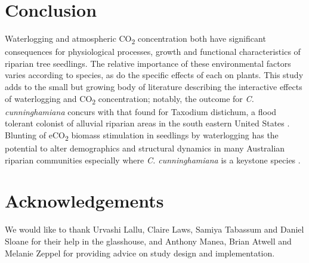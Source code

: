 \documentclass[12pt,a4paper]{memoir}
\begin{document}
\section{Conclusion}
Waterlogging and atmospheric CO\textsubscript{2} concentration both have significant consequences for physiological processes, growth and functional characteristics of riparian tree seedlings. The relative importance of these environmental factors varies according to species, as do the specific effects of each on plants. This study adds to the small but growing body of literature describing the interactive effects of waterlogging and CO\textsubscript{2} concentration; notably, the outcome for \textit{C. cunninghamiana} concurs with that found for Taxodium distichum, a flood tolerant colonist of alluvial riparian areas in the south eastern United States \citep{Megonigal2005}. Blunting of eCO\textsubscript{2} biomass stimulation in seedlings by waterlogging has the potential to alter demographics and structural dynamics in many Australian riparian communities especially where \textit{C. cunninghamiana} is a keystone species \citep{Woolfrey2001}.

\section*{Acknowledgements}
We would like to thank Urvashi Lallu, Claire Laws, Samiya Tabassum and Daniel Sloane for their help in the glasshouse, and Anthony Manea, Brian Atwell and Melanie Zeppel for providing advice on study design and implementation.
\renewcommand\bibname{{References}} 
\begin{small}


\end{small}
\end{document}
